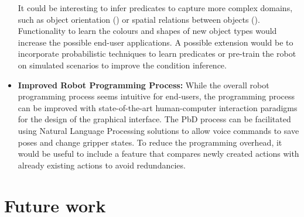 \begin{itemize}
{	It could be interesting to infer predicates to capture more complex domains, such as object orientation (\cite{li2016learning}) or spatial relations between objects (\cite{tremblay2018synthetically}).
	Functionality to learn the colours and shapes of new object types would increase the possible end-user applications.
	A possible extension would be to incorporate probabilistic techniques to learn predicates or pre-train the robot on simulated scenarios to improve the condition inference.
}
\item {
	\textbf{Improved Robot Programming Process:}
	While the overall robot programming process seems intuitive for end-users, the programming process can be improved with state-of-the-art human-computer interaction paradigms for the design of the graphical interface.
	The PbD process can be facilitated using Natural Language Processing solutions to allow voice commands to save poses and change gripper states.
	To reduce the programming overhead, it would be useful to include a feature that compares newly created actions with already existing actions to avoid redundancies.
}
\end{itemize}




\section{Future work}
%

